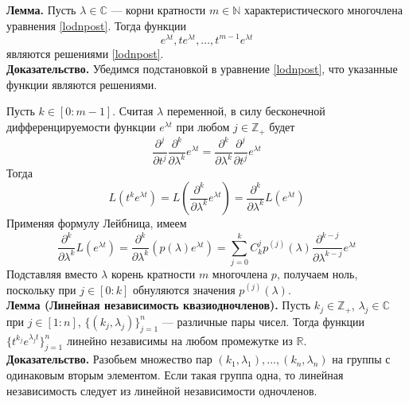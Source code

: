 \noindent \textbf{Лемма.} Пусть $\lambda \in \mathbb{C}$ --- корни кратности $m \in \mathbb{N}$ характеристического многочлена уравнения \eqref{lodnpost}. Тогда функции
\begin{equation*}
    e^{\lambda t}, te^{\lambda t}, \ldots, t^{m-1}e^{\lambda t}
\end{equation*}
являются решениями \eqref{lodnpost}.\\

\noindent \textbf{Доказательство.} Убедимся подстановкой в уравнение \eqref{lodnpost}, что указанные функции являются решениями.

Пусть $k \in [0 : m-1]$. Считая $\lambda$ переменной, в силу бесконечной дифференцируемости функции $e^{\lambda t}$ при любом $j \in \mathbb{Z}_{+}$ будет
\begin{equation*}
    \frac{\partial^j}{\partial t^j}\frac{\partial^k}{\partial \lambda^k}e^{\lambda t} = \frac{\partial^k}{\partial\lambda^k}\frac{\partial^j}{\partial t^j}e^{\lambda t}
\end{equation*}
Тогда
\begin{equation*}
    L(t^ke^{\lambda t}) = L\left(\frac{\partial^k}{\partial\lambda^k}e^{\lambda t} \right) = \frac{\partial^k}{\partial\lambda^k}L(e^{\lambda t})
\end{equation*}
Применяя формулу Лейбница, имеем
\begin{equation*}
    \frac{\partial^k}{\partial\lambda^k}L(e^{\lambda t}) = \frac{\partial^k}{\partial\lambda^k} (p(\lambda)e^{\lambda t}) = \sum_{j = 0}^k C_k^j p^{(j)}(\lambda)\frac{\partial^{k - j}}{\partial\lambda^{k - j}} e^{\lambda t}
\end{equation*}
Подставляя вместо $\lambda$ корень кратности $m$ многочлена $p$, получаем ноль, поскольку при $j \in [0 : k]$ обнуляются значения $p^{(j)}(\lambda)$.\\

\noindent \textbf{Лемма (Линейная независимость квазиодночленов).} Пусть $k_j \in \mathbb{Z}_{+}$, $\lambda_j \in \mathbb{C}$ при $j \in [1 : n]$, $\{(k_j,\lambda_j)\}_{j=1}^n$ --- различные пары чисел. Тогда функции $\{t^{k_j}e^{\lambda_jt}\}_{j=1}^n$ линейно независимы на любом промежутке из $\mathbb{R}$.\\

\noindent \textbf{Доказательство.} Разобьем множество пар $(k_1, \lambda_1), \ldots, (k_n, \lambda_n)$ на группы с одинаковым вторым элементом. Если такая группа одна, то линейная независимость следует из линейной независимости одночленов.

